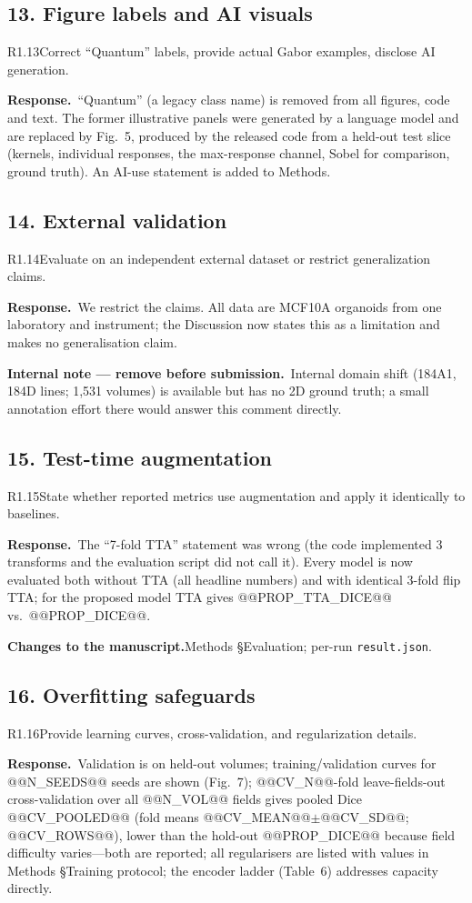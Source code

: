 \documentclass[11pt]{article}
\newif\ifinternal \internaltrue
\newcommand{\response}{\par\medskip\noindent\textbf{\color{bblue}Response.}\ }
\newcommand{\actions}{\par\medskip\noindent\textbf{Changes to the manuscript.}}
\newcommand{\internalnote}[1]{\ifinternal\begin{tcolorbox}[breakable,colback=notebg,colframe=notefr,boxrule=0.5pt,arc=2pt]\footnotesize\textbf{Internal note --- remove before submission.}\ #1\end{tcolorbox}\fi}
\begin{document}
\subsection*{13. Figure labels and AI visuals}
\begin{rcomment}{R1.13}Correct ``Quantum'' labels, provide actual Gabor examples, disclose AI generation.\end{rcomment}
\response ``Quantum'' (a legacy class name) is removed from all figures, code and text. The former illustrative panels were generated by a language model and are replaced by Fig.~5, produced by the released code from a held-out test slice (kernels, individual responses, the max-response channel, Sobel for comparison, ground truth). An AI-use statement is added to Methods.

\subsection*{14. External validation}
\begin{rcomment}{R1.14}Evaluate on an independent external dataset or restrict generalization claims.\end{rcomment}
\response We restrict the claims. All data are MCF10A organoids from one laboratory and instrument; the Discussion now states this as a limitation and makes no generalisation claim. \internalnote{Internal domain shift (184A1, 184D lines; 1,531 volumes) is available but has no 2D ground truth; a small annotation effort there would answer this comment directly.}

\subsection*{15. Test-time augmentation}
\begin{rcomment}{R1.15}State whether reported metrics use augmentation and apply it identically to baselines.\end{rcomment}
\response The ``7-fold TTA'' statement was wrong (the code implemented 3 transforms and the evaluation script did not call it). Every model is now evaluated both without TTA (all headline numbers) and with identical 3-fold flip TTA; for the proposed model TTA gives @@PROP_TTA_DICE@@ vs.\ @@PROP_DICE@@.
\actions Methods §Evaluation; per-run \texttt{result.json}.

\subsection*{16. Overfitting safeguards}
\begin{rcomment}{R1.16}Provide learning curves, cross-validation, and regularization details.\end{rcomment}
\response Validation is on held-out volumes; training/validation curves for @@N_SEEDS@@ seeds are shown (Fig.~7); @@CV_N@@-fold leave-fields-out cross-validation over all @@N_VOL@@ fields gives pooled Dice @@CV_POOLED@@ (fold means @@CV_MEAN@@$\pm$@@CV_SD@@; @@CV_ROWS@@), lower than the hold-out @@PROP_DICE@@ because field difficulty varies---both are reported; all regularisers are listed with values in Methods §Training protocol; the encoder ladder (Table~6) addresses capacity directly.
\end{document}
